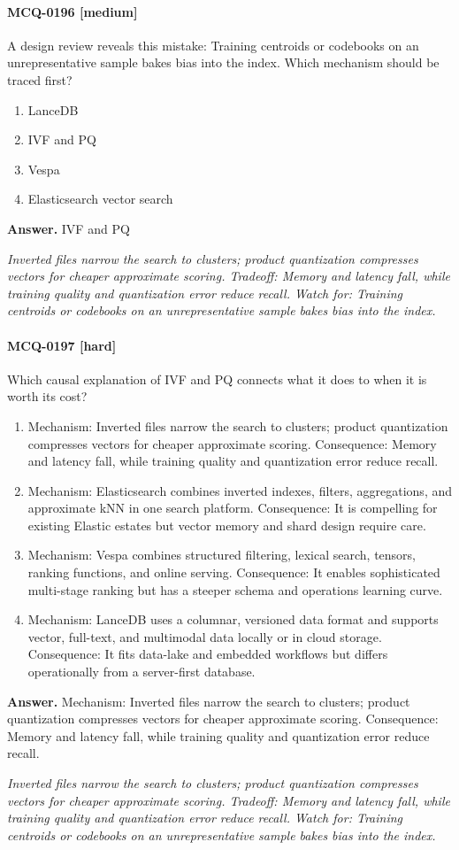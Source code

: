 \paragraph{MCQ-0196 [medium]} A design review reveals this mistake: Training centroids or codebooks on an unrepresentative sample bakes bias into the index. Which mechanism should be traced first?
\begin{enumerate}[label=\Alph*.]
\item LanceDB
\item IVF and PQ
\item Vespa
\item Elasticsearch vector search
\end{enumerate}
\noindent\textbf{Answer.} IVF and PQ
\par\textit{Inverted files narrow the search to clusters; product quantization compresses vectors for cheaper approximate scoring. Tradeoff: Memory and latency fall, while training quality and quantization error reduce recall. Watch for: Training centroids or codebooks on an unrepresentative sample bakes bias into the index.}
\paragraph{MCQ-0197 [hard]} Which causal explanation of IVF and PQ connects what it does to when it is worth its cost?
\begin{enumerate}[label=\Alph*.]
\item Mechanism: Inverted files narrow the search to clusters; product quantization compresses vectors for cheaper approximate scoring. Consequence: Memory and latency fall, while training quality and quantization error reduce recall.
\item Mechanism: Elasticsearch combines inverted indexes, filters, aggregations, and approximate kNN in one search platform. Consequence: It is compelling for existing Elastic estates but vector memory and shard design require care.
\item Mechanism: Vespa combines structured filtering, lexical search, tensors, ranking functions, and online serving. Consequence: It enables sophisticated multi-stage ranking but has a steeper schema and operations learning curve.
\item Mechanism: LanceDB uses a columnar, versioned data format and supports vector, full-text, and multimodal data locally or in cloud storage. Consequence: It fits data-lake and embedded workflows but differs operationally from a server-first database.
\end{enumerate}
\noindent\textbf{Answer.} Mechanism: Inverted files narrow the search to clusters; product quantization compresses vectors for cheaper approximate scoring. Consequence: Memory and latency fall, while training quality and quantization error reduce recall.
\par\textit{Inverted files narrow the search to clusters; product quantization compresses vectors for cheaper approximate scoring. Tradeoff: Memory and latency fall, while training quality and quantization error reduce recall. Watch for: Training centroids or codebooks on an unrepresentative sample bakes bias into the index.}
